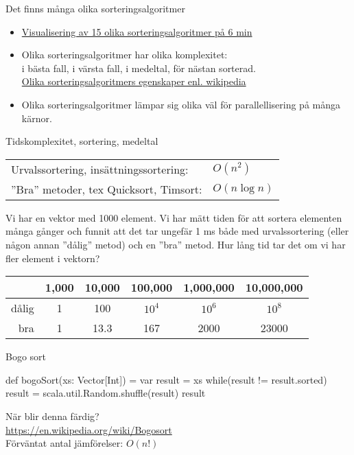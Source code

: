 \begin{Slide}{Det finns många olika sorteringsalgoritmer}
\begin{itemize}
\item \href{https://www.youtube.com/watch?v=kPRA0W1kECg}{Visualisering av 15 olika sorteringsalgoritmer på 6 min}
\item Olika sorteringsalgoritmer har olika komplexitet: \\ i bästa fall, i värsta fall, i medeltal, för nästan sorterad. \\
\href{https://en.wikipedia.org/wiki/Sorting_algorithm}{Olika sorteringsalgoritmers egenskaper enl. wikipedia}
\item Olika sorteringsalgoritmer lämpar sig olika väl för parallellisering på många kärnor.
\end{itemize}
\end{Slide}


\begin{Slide}{Tidskomplexitet, sortering, medeltal}
\begin{tabular}{ll}
Urvalssortering, insättningssortering: & $O(n^2)$ \\
''Bra'' metoder, tex Quicksort, Timsort:  & $O(n\log n)$
\end{tabular}

\vspace{1em}\footnotesize
Vi har en vektor med 1000 element. Vi har mätt tiden för att sortera elementen många gånger och funnit att det tar ungefär 1 ms både med urvalssortering (eller någon annan ''dålig'' metod) och en ''bra'' metod. Hur lång tid tar det om vi har fler element i vektorn?

\vspace{1em}
\begin{tabular}{rccccc}
       & 1,000 & 10,000 & 100,000 & 1,000,000 & 10,000,000 \\ \hline
dålig  & 1     & 100    & $10^4$  & $10^6$   & $10^8$ \\
bra    & 1     & 13.3   & 167     & 2000     & 23000
\end{tabular}
\end{Slide}

\begin{Slide}{Bogo sort}
\begin{Code}
def bogoSort(xs: Vector[Int]) = {
  var result = xs
  while(result != result.sorted) {
    result = scala.util.Random.shuffle(result)
  }
  result
}
\end{Code}
När blir denna färdig? \pause \\
\url{https://en.wikipedia.org/wiki/Bogosort}\\
Förväntat antal jämförelser: $ O(n!) $
\end{Slide}

